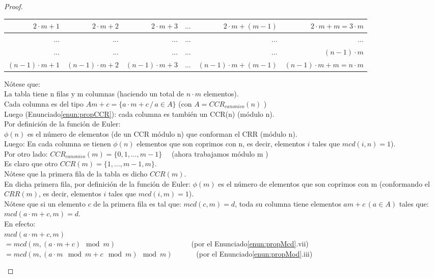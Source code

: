 \begin{proof}
\begin{enumerate}[label=\roman*)]
\begin{center}
\begin{tabular}{|r|r|r|l|r|r|}
\hline
$2 \cdot m+1$ & $2 \cdot m+2$ & $2 \cdot m+3$ & $\ldots$ & $2 \cdot m+(m-1)$ & $2 \cdot m+m=3 \cdot m$ \\
\hline
$\ldots$ & $\ldots$ & $\ldots$ & $\ldots$ & $\ldots$ & $\ldots$ \\
\hline
$\ldots$ & $\ldots$ & $\ldots$ & $\ldots$ & $\ldots$ & $(n-1) \cdot m$ \\
\hline
$(n-1) \cdot m+1$ & $(n-1) \cdot m+2$ & $(n-1) \cdot m+3$ & $\ldots$ & $(n-1) \cdot m+(m-1)$ & $(n-1) \cdot m+m=n \cdot m$ \\
\hline
\end{tabular}
\end{center}
Nótese que:\\
La tabla tiene n filas y m columnas (haciendo un total de $n \cdot m$ elementos).\\
Cada columna es del tipo $Am+c=\{a \cdot m+c \, / \, a \in A\}$ (con $A=CCR_{canonico}(n)$ )\\
Luego (Enunciado\ref{enun:propCCR}): cada columna es también un CCR(n) (módulo n).\\
Por definición de la función de Euler: \\
$\phi(n)$ es el número de elementos (de un CCR módulo n) que conforman el CRR (módulo n).\\
Luego: En cada columna se tienen $\phi(n)$ elementos que son coprimos con n, es decir, elementos $i$ tales que $mcd(i, n)=1$).\\
Por otro lado: $CCR_{canonico}(m)=\{0,1, \ldots, m-1\} \quad$ (ahora trabajamos módulo m )\\
Es claro que otro $CCR(m)=\{1, \ldots, m-1, m\}$.\\
Nótese que la primera fila de la tabla es dicho $CCR(m)$.\\
En dicha primera fila, por definición de la función de Euler: $\phi(m)$ es el número de elementos que son coprimos con m (conformando el $CRR(m)$, es decir, elementos $i$ tales que $mcd(i, m)=1$).\\
Nótese que si un elemento $c$ de la primera fila es tal que: $mcd(c, m)=d$, toda su columna tiene elementos $am+c \, (a \in A)$ tales que: $mcd(a \cdot m+c, m)=d$.\\
En efecto:\\
$mcd(a \cdot m+c,m)$\\
$=mcd(m,(a \cdot m+c) \mod m) \quad\quad\quad\quad\quad\quad\quad\quad\quad\quad\;$ (por el Enunciado\ref{enun:propMcd}.vii)\\
$=mcd(m,(a \cdot m \mod m+c \mod m) \mod m) \quad\quad\quad$ (por el Enunciado\ref{enun:propMod}.iii)\\

\end{enumerate}
\end{proof}

